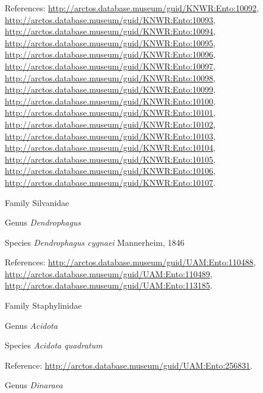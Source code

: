 \documentclass[9pt, article]{memoir}
\begin{document}
\begin{multicols}{2}
References: 
\url{http://arctos.database.museum/guid/KNWR:Ento:10092}, 
\url{http://arctos.database.museum/guid/KNWR:Ento:10093}, 
\url{http://arctos.database.museum/guid/KNWR:Ento:10094}, 
\url{http://arctos.database.museum/guid/KNWR:Ento:10095}, 
\url{http://arctos.database.museum/guid/KNWR:Ento:10096}, 
\url{http://arctos.database.museum/guid/KNWR:Ento:10097}, 
\url{http://arctos.database.museum/guid/KNWR:Ento:10098}, 
\url{http://arctos.database.museum/guid/KNWR:Ento:10099}, 
\url{http://arctos.database.museum/guid/KNWR:Ento:10100}, 
\url{http://arctos.database.museum/guid/KNWR:Ento:10101}, 
\url{http://arctos.database.museum/guid/KNWR:Ento:10102}, 
\url{http://arctos.database.museum/guid/KNWR:Ento:10103}, 
\url{http://arctos.database.museum/guid/KNWR:Ento:10104}, 
\url{http://arctos.database.museum/guid/KNWR:Ento:10105}, 
\url{http://arctos.database.museum/guid/KNWR:Ento:10106}, 
\url{http://arctos.database.museum/guid/KNWR:Ento:10107}.

\vspace{6pt}\noindent\hspace{24pt}Family Silvanidae


\vspace{6pt}\noindent\hspace{30pt}Genus \textit{Dendrophagus}


\vspace{6pt}\noindent\hspace{36pt}Species \textit{Dendrophagus cygnaei} Mannerheim, 1846


References: 
\url{http://arctos.database.museum/guid/UAM:Ento:110488}, 
\url{http://arctos.database.museum/guid/UAM:Ento:110489}, 
\url{http://arctos.database.museum/guid/UAM:Ento:113185}.

\vspace{6pt}\noindent\hspace{24pt}Family Staphylinidae


\vspace{6pt}\noindent\hspace{30pt}Genus \textit{Acidota}


\vspace{6pt}\noindent\hspace{36pt}Species \textit{Acidota quadratum}


Reference: 
\url{http://arctos.database.museum/guid/UAM:Ento:256831}.

\vspace{6pt}\noindent\hspace{30pt}Genus \textit{Dinaraea}



\end{multicols}
\end{document}
